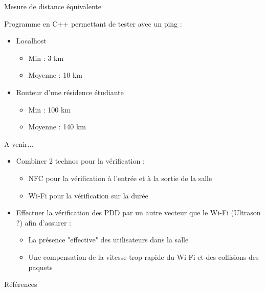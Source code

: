 \documentclass[aspectratio=169]{beamer}
\begin{document}
\begin{frame}{Mesure de distance équivalente}
        
    Programme en C++ permettant de tester avec un ping :
    \begin{itemize}
        \item Localhost
        \begin{itemize}
            \item Min : 3 km
            \item Moyenne : 10 km
        \end{itemize}
        \item Routeur d'une résidence étudiante
        \begin{itemize}
            \item Min : 100 km
            \item Moyenne : 140 km
        \end{itemize}
    \end{itemize}

\end{frame}

\begin{frame}{A venir...}
    
    \begin{itemize}
        \item Combiner 2 technos pour la vérification :
        \begin{itemize}
            \item NFC pour la vérification à l'entrée et à la sortie de la salle            \item Wi-Fi pour la vérification sur la durée
        \end{itemize}
        \pause
        \bigskip
        \item Effectuer la vérification des PDD par un autre vecteur que le Wi-Fi (Ultrason ?) afin d'assurer :
        \begin{itemize}
            \item La présence "effective" des utilisateurs dans la salle
            \item Une compensation de la vitesse trop rapide du Wi-Fi et des collisions des paquets
        \end{itemize}

    \end{itemize}

    
\end{frame}

\begin{frame}{Références}
  \printbibliography
\end{frame}
\end{document}
